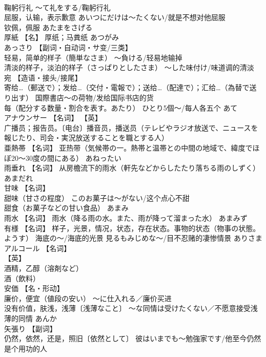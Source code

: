 \documentclass[8pt]{extreport}
\begin{document}
\begin{CJK}{UTF8}{min}
\\	鞠躬行礼 ～て礼をする/鞠躬行礼 
\\	屈服，认输，表示歉意 あいつにだけは～たくない/就是不想对他屈服 
\\	钦佩，佩服	あたまをさげる	
\\	厚紙	【名】 厚纸；马粪纸	あつがみ	
\\	あっさり	【副词・自动词・サ变/三类】 
\\	轻易，简单的样子（簡単なさま） ～負ける/轻易地输掉 
\\	清淡的样子，淡泊的样子（さっぱりとしたさま） ～した味付け/味道调的清淡		
\\	宛	【造语・接头/接尾】 
\\	寄给…（郵送で）；发给…（交付・電報で）；送给…（配達で）；汇给…（為替で送り出す） 国際書店～の荷物/发给国际书店的货 
\\	每（配分する数量・割合を表す。あたり） ひとり5個～/每人各五个	あて	
\\	アナウンサー	【名词】 【英】
\\	广播员；报告员。〔电台〕播音员，播送员（テレビやラジオ放送で、ニュースを報じたり、司会・実況放送することを職とする人）		
\\	亜熱帯	【名词】 亚热带（気候帯の一。熱帯と温帯との中間の地域で、緯度でほぼ20～30度の間にある）	あねったい	
\\	雨垂れ	【名词】 从房檐流下的雨水（軒先などからしたたり落ちる雨のしずく）	あまだれ	
\\	甘味	【名词】 
\\	甜味（甘さの程度） このお菓子は～がない/这个点心不甜 
\\	甜食（お菓子などの甘い食品）	あまみ	
\\	雨水	【名词】 雨水（降る雨の水。また、雨が降って溜まった水）	あまみず	
\\	有様	【名词】 样子，光景，情况，状态，存在状态。事物的状态（物事の状態。ようす） 海底の～/海底的光景 見るもみじめな～/目不忍赌的凄惨情景	ありさま	
\\	アルコール	【名词】 
\\	【英】
\\	酒精，乙醇（溶剤など） 
\\	酒（飲料）		
\\	安価	【名・形动】 
\\	廉价，便宜（値段の安い） ～に仕入れる／廉价买进 
\\	没有价值，肤浅，浅薄〔浅薄なこと〕 ～な同情は受けたくない／不愿意接受浅薄的同情	あんか	
\\	矢張り	【副词】 
\\	仍然，依然，还是，照旧〔依然として〕 彼はいまでも～勉強家です/他至今仍然是个用功的人 

\end{CJK}
\end{document}

